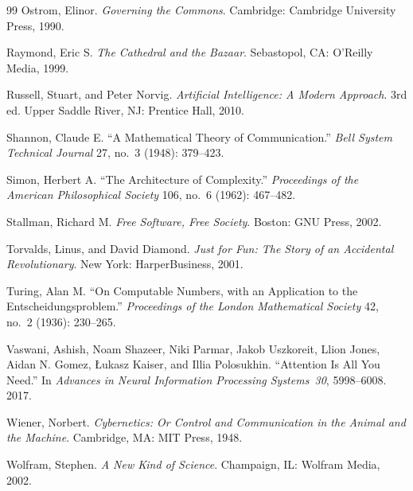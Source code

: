 \documentclass[11pt]{article}
\begin{document}
\begin{thebibliography}{99}
Ostrom, Elinor.
\textit{Governing the Commons}.
Cambridge: Cambridge University Press, 1990.

Raymond, Eric S.
\textit{The Cathedral and the Bazaar}.
Sebastopol, CA\@: O'Reilly Media, 1999.

Russell, Stuart, and Peter Norvig.
\textit{Artificial Intelligence: A Modern Approach}.
3rd ed.
Upper Saddle River, NJ\@: Prentice Hall, 2010.

Shannon, Claude E.
``A Mathematical Theory of Communication.''
\textit{Bell System Technical Journal} 27, no.~3 (1948): 379--423.

Simon, Herbert A.
``The Architecture of Complexity.''
\textit{Proceedings of the American Philosophical Society} 106, no.~6
(1962): 467--482.

Stallman, Richard M.
\textit{Free Software, Free Society}.
Boston: GNU Press, 2002.

Torvalds, Linus, and David Diamond.
\textit{Just for Fun: The Story of an Accidental Revolutionary}.
New York: HarperBusiness, 2001.

Turing, Alan M.
``On Computable Numbers, with an Application to the Entscheidungsproblem.''
\textit{Proceedings of the London Mathematical Society} 42, no.~2
(1936): 230--265.

Vaswani, Ashish, Noam Shazeer, Niki Parmar, Jakob Uszkoreit,
Llion Jones, Aidan N. Gomez, {\L}ukasz Kaiser, and Illia Polosukhin.
``Attention Is All You Need.''
In \textit{Advances in Neural Information Processing Systems~30},
5998--6008. 2017.

Wiener, Norbert.
\textit{Cybernetics: Or Control and Communication in the Animal and the Machine}.
Cambridge, MA\@: MIT Press, 1948.

Wolfram, Stephen.
\textit{A New Kind of Science}.
Champaign, IL\@: Wolfram Media, 2002.

\end{thebibliography}
\end{document}
